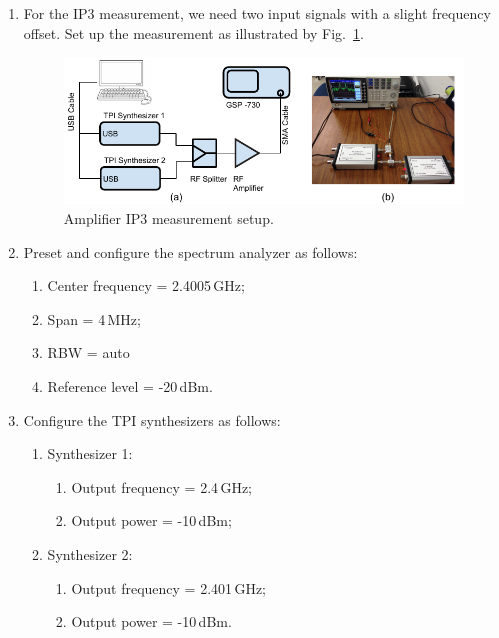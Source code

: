 \documentclass[letterpaper, 11pt]{article}
\begin{document}
\begin{enumerate}
	\item For the IP3 measurement, we need two input signals with a slight frequency offset. Set up the measurement as illustrated by Fig.~\ref{fig:setup-two-tone-amp}.
		\begin{figure}[h]
			\centering
			\includegraphics[width=4.5in]{setup-two-tone-amp}
			\caption{Amplifier IP3 measurement setup.}
			\label{fig:setup-two-tone-amp}
		\end{figure}
	
	\item Preset and configure the spectrum analyzer as follows:
		\begin{enumerate}
			\item Center frequency = 2.4005\,GHz;
			\item Span = 4\,MHz;
			\item RBW = auto
			\item Reference level = -20\,dBm.
		\end{enumerate}
	
	\item Configure the TPI synthesizers as follows:
		\begin{enumerate}
			\item Synthesizer 1:
				\begin{enumerate}
					\item Output frequency = 2.4\,GHz;
					\item Output power = -10\,dBm;
				\end{enumerate}
			\item Synthesizer 2:
				\begin{enumerate}
					\item Output frequency = 2.401\,GHz;
					\item Output power = -10\,dBm.
				\end{enumerate}
		\end{enumerate}
	

\end{enumerate}
\end{document}

